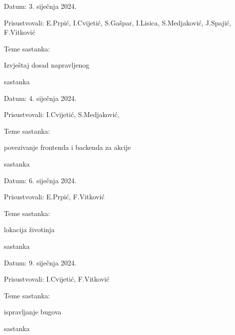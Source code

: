 \begin{packed_enum}
\begin{packed_item}
				\item Datum: 3. siječnja 2024.
				\item Prisustvovali: E.Prpić, I.Cvijetić, S.Gašpar, I.Lisica, S.Medjaković, J.Spajić, F.Vitković
				\item Teme sastanka:
				\begin{packed_item}
					\item  Izvještaj dosad napravljenog
				\end{packed_item}
			\end{packed_item}
			\item  sastanka
			\item[] \begin{packed_item}
				\item Datum: 4. siječnja 2024.
				\item Prisustvovali: I.Cvijetić, S.Medjaković,
				\item Teme sastanka:
				\begin{packed_item}
					\item  povezivanje frontenda i backenda za akcije
				\end{packed_item}
			\end{packed_item}
			\item  sastanka
			\item[] \begin{packed_item}
				\item Datum: 6. siječnja 2024.
				\item Prisustvovali: E.Prpić, F.Vitković
				\item Teme sastanka:
				\begin{packed_item}
					\item  lokacija životinja
				\end{packed_item}
			\end{packed_item}
			\item  sastanka
			\item[] \begin{packed_item}
				\item Datum: 9. siječnja 2024.
				\item Prisustvovali: I.Cvijetić, F.Vitković
				\item Teme sastanka:
				\begin{packed_item}
					\item  ispravljanje bugova
				\end{packed_item}
			\end{packed_item}
			\item  sastanka

\end{packed_enum}
